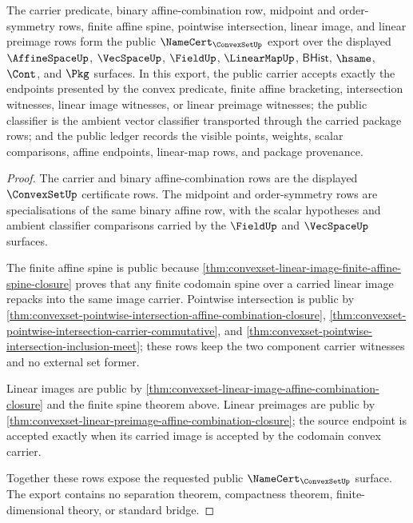 \begin{theorem}
\label{thm:convexset-public-namecert-export}
The carrier predicate, binary affine-combination row, midpoint and
order-symmetry rows, finite affine spine, pointwise intersection, linear image,
and linear preimage rows form the public
$\NameCert_{\ConvexSetUp}$ export over the displayed $\AffineSpaceUp$,
$\VecSpaceUp$, $\FieldUp$, $\LinearMapUp$, $\mathsf{BHist}$, $\hsame$, $\Cont$,
and $\Pkg$ surfaces. In this export, the public carrier accepts exactly the
endpoints presented by the convex predicate, finite affine bracketing,
intersection witnesses, linear image witnesses, or linear preimage witnesses;
the public classifier is the ambient vector classifier transported through the
carried package rows; and the public ledger records the visible points,
weights, scalar comparisons, affine endpoints, linear-map rows, and package
provenance.
\end{theorem}
\begin{proof}
The carrier and binary affine-combination rows are the displayed
$\ConvexSetUp$ certificate rows. The midpoint and order-symmetry rows are
specialisations of the same binary affine row, with the scalar hypotheses and
ambient classifier comparisons carried by the $\FieldUp$ and $\VecSpaceUp$
surfaces.

The finite affine spine is public because
\autoref{thm:convexset-linear-image-finite-affine-spine-closure} proves that
any finite codomain spine over a carried linear image repacks into the same
image carrier. Pointwise intersection is public by
\autoref{thm:convexset-pointwise-intersection-affine-combination-closure},
\autoref{thm:convexset-pointwise-intersection-carrier-commutative}, and
\autoref{thm:convexset-pointwise-intersection-inclusion-meet}; these rows keep
the two component carrier witnesses and no external set former.

Linear images are public by
\autoref{thm:convexset-linear-image-affine-combination-closure} and the finite
spine theorem above. Linear preimages are public by
\autoref{thm:convexset-linear-preimage-affine-combination-closure}; the source
endpoint is accepted exactly when its carried image is accepted by the codomain
convex carrier.

Together these rows expose the requested public $\NameCert_{\ConvexSetUp}$
surface. The export contains no separation theorem, compactness theorem,
finite-dimensional theory, or standard bridge.
\end{proof}

